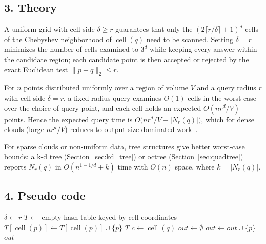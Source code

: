 \subsection{3. Theory}

A uniform grid with cell side $\delta \ge r$ guarantees that only the
$(2\lceil r/\delta \rceil + 1)^d$ cells of the Chebyshev neighborhood of
$\operatorname{cell}(q)$ need to be scanned. Setting $\delta = r$ minimizes
the number of cells examined to $3^d$ while keeping every answer within the
candidate region; each candidate point is then accepted or rejected by the
exact Euclidean test $\|p - q\|_2 \le r$.

\begin{theorem}\label{thm:fixed_radius_cost}
For $n$ points distributed uniformly over a region of volume $V$ and a query
radius $r$ with cell side $\delta = r$, a fixed-radius query examines
$O(1)$ cells in the worst case over the choice of query point, and each cell
holds an expected $O(n r^d / V)$ points. Hence the expected query time is
$O\bigl(n r^d / V + |N_r(q)|\bigr)$, which for dense clouds (large
$n r^d / V$) reduces to output-size dominated work~\cite{berg2008}.
\end{theorem}

For sparse clouds or non-uniform data, tree structures give better
worst-case bounds: a k-d tree (Section~\ref{sec:kd_tree}) or octree
(Section~\ref{sec:quadtree}) reports $N_r(q)$ in $O(n^{1-1/d} + k)$ time with
$O(n)$ space, where $k = |N_r(q)|$.

\subsection{4. Pseudo code}

\begin{algorithm}
\caption{Fixed-Radius Neighbor Search}\label{alg:fixed_radius_search}
\begin{algorithmic}
    \State $\delta \gets r$
    \State $T \gets$ empty hash table keyed by cell coordinates
        \State $T[\operatorname{cell}(p)] \gets T[\operatorname{cell}(p)] \cup \{p\}$
    \EndFor
    \State \Return $T$
\EndFunction
{}
    \State $c \gets \operatorname{cell}(q)$
    \State $out \gets \emptyset$
             
                \State $out \gets out \cup \{p\}$
            \EndIf
        \EndFor
    \EndFor
    \State \Return $out$
\EndFunction
\end{algorithmic}
\end{algorithm}

